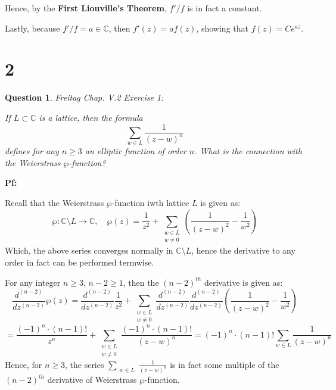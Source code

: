 \documentclass{article}
\newtheorem{question}{Question}
\begin{document}
Hence, by the \textbf{First Liouville's Theorem}, $f'/f$ is in fact a constant.

Lastly, because $f'/f = a\in\mathbb{C}$, then $f'(z)=af(z)$, showing that $f(z)=Ce^{az}$.

\break

\section*{2}
\begin{myBox}[]{}
    \begin{question}
        Freitag Chap. V.2 Exercise 1:

        If $L\subset \mathbb{C}$ is a lattice, then the formula
        $$\sum_{w\in L}\frac{1}{(z-w)^n}$$
        defines for any $n\geq 3$ an elliptic function of order $n$. What is the connection with the Weierstrass $\wp$-function?
    \end{question}
\end{myBox}

\textbf{Pf:}

Recall that the Weierstrass $\wp$-function iwth lattice $L$ is given as:
$$\wp:\mathbb{C}\setminus L\rightarrow\mathbb{C},\quad \wp(z)=\frac{1}{z^2}+\sum_{\substack{w\in L \\ w\neq 0}}\left(\frac{1}{(z-w)^2}-\frac{1}{w^2}\right)$$
Which, the above series converges normally in $\mathbb{C}\setminus L$, hence the derivative to any order in fact can be performed termwise.

For any integer $n\geq 3$, $n-2\geq 1$, then the $(n-2)^{th}$ derivative is given as:
$$\frac{d^{(n-2)}}{dz^{(n-2)}}\wp(z)=\frac{d^{(n-2)}}{dz^{(n-2)}}\frac{1}{z^2}+\sum_{\substack{w\in L \\ w\neq 0}}\frac{d^{(n-2)}}{dz^{(n-2)}}\frac{d^{(n-2)}}{dz^{(n-2)}}\left(\frac{1}{(z-w)^2}-\frac{1}{w^2}\right)$$
$$ = \frac{(-1)^n\cdot (n-1)!}{z^n}+\sum_{\substack{w\in L \\ w\neq 0}}\frac{(-1)^n\cdot(n-1)!}{(z-w)^n} = (-1)^n\cdot(n-1)!\sum_{w\in L}\frac{1}{(z-w)^n}$$
Hence, for $n\geq 3$, the series $\sum_{\substack{w\in L}}\frac{1}{(z-w)^n}$ is in fact some multiple of the $(n-2)^{th}$ derivative of Weierstrass $\wp$-function.

\break
\end{document}
